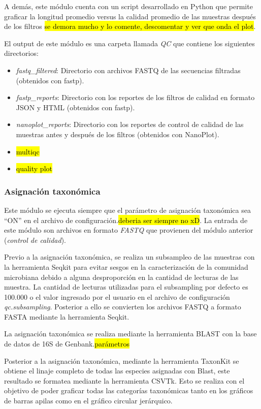 A demás, este módulo cuenta con un script desarrollado en Python que permite graficar la longitud promedio versus la calidad promedio de las muestras después de los filtros \hl{se demora mucho y lo comente, descomentar y ver que onda el plot}.

El output de este módulo es una carpeta llamada \textit{QC} que contiene los siguientes directorios:
\begin{itemize}
    \item \textit{fastq\_filtered}: Directorio con archivos FASTQ de las secuencias filtradas (obtenidos con fastp).
    \item \textit{fastp\_reports}: Directorio con los reportes de los filtros de calidad en formato JSON y HTML (obtenidos con fastp).
    \item \textit{nanoplot\_reports}: Directorio con los reportes de control de calidad de las muestras antes y después de los filtros (obtenidos con NanoPlot).
    \item \hl{multiqc}
    \item \hl{quality plot}
\end{itemize}

\subsubsection{Asignación taxonómica}
Este módulo se ejecuta siempre que el parámetro de asignación taxonómica sea ``ON'' en el archivo de configuración.\hl{deberia ser siempre no xD}.
La entrada de este módulo son archivos en formato \textit{FASTQ} que provienen del módulo anterior (\textit{control de calidad}).

Previo a la asignación taxonómica, se realiza un subsampleo de las muestras con la herramienta Seqkit para evitar sesgos en la caracterización de la comunidad microbiana debido a alguna desproporción en la cantidad de lecturas de las muestra.
La cantidad de lecturas utilizadas para el subsampling por defecto es 100.000 o el valor ingresado por el usuario en el archivo de configuración \textit{qc.subsampling}.
Posterior a ello se convierten los archivos FASTQ a formato FASTA mediante la herramienta Seqkit.

La asignación taxonómica se realiza mediante la herramienta BLAST con la base de datos de 16S de Genbank.\hl{parámetros}

Posterior a la asignación taxonómica, mediante la herramienta TaxonKit se obtiene el linaje completo de todas las especies asignadas con Blast, este resultado se formatea mediante la herramienta CSVTk. 
Esto se realiza con el objetivo de poder graficar todas las categorías taxonómicas tanto en los gráficos de barras apilas como en el gráfico circular jerárquico.

